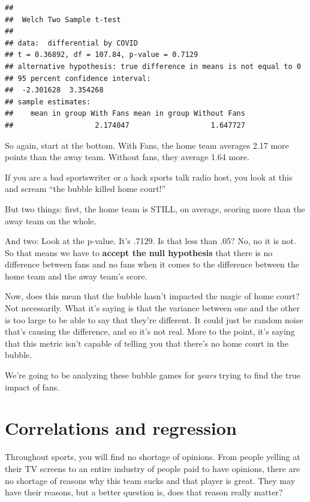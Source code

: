 \documentclass[
]{book}
\begin{document}
\begin{verbatim}
## 
##  Welch Two Sample t-test
## 
## data:  differential by COVID
## t = 0.36892, df = 107.84, p-value = 0.7129
## alternative hypothesis: true difference in means is not equal to 0
## 95 percent confidence interval:
##  -2.301628  3.354268
## sample estimates:
##    mean in group With Fans mean in group Without Fans 
##                   2.174047                   1.647727
\end{verbatim}

So again, start at the bottom. With Fans, the home team averages 2.17 more points than the away team. Without fans, they average 1.64 more.

If you are a bad sportswriter or a hack sports talk radio host, you look at this and scream ``the bubble killed home court!''

But two things: first, the home team is STILL, on average, scoring more than the away team on the whole.

And two: Look at the p-value. It's .7129. Is that less than .05? No, no it is not. So that means we have to \textbf{accept the null hypothesis} that there is no difference between fans and no fans when it comes to the difference between the home team and the away team's score.

Now, does this mean that the bubble hasn't impacted the magic of home court? Not necessarily. What it's saying is that the variance between one and the other is too large to be able to say that they're different. It could just be random noise that's causing the difference, and so it's not real. More to the point, it's saying that this metric isn't capable of telling you that there's no home court in the bubble.

We're going to be analyzing these bubble games for \emph{years} trying to find the true impact of fans.

\hypertarget{correlations-and-regression}{%
\chapter{Correlations and regression}\label{correlations-and-regression}}

Throughout sports, you will find no shortage of opinions. From people yelling at their TV screens to an entire industry of people paid to have opinions, there are no shortage of reasons why this team sucks and that player is great. They may have their reasons, but a better question is, does that reason really matter?
\end{document}
